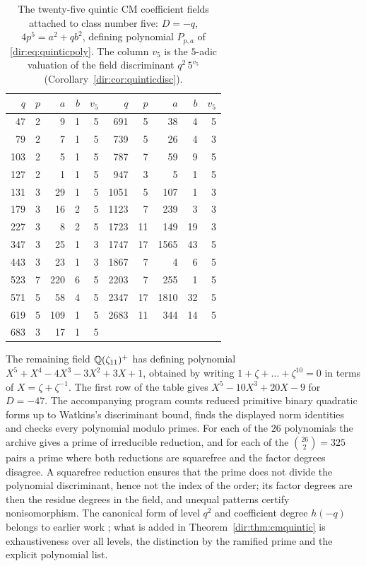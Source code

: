 \begin{table}[ht]
\centering\small
\begin{tabular}{rrrrr@{\qquad}rrrrr}
\toprule
$q$ & $p$ & $a$ & $b$ & $v_5$ & $q$ & $p$ & $a$ & $b$ & $v_5$\\
\midrule
47 & 2 & 9 & 1 & 5 & 691 & 5 & 38 & 4 & 5\\
79 & 2 & 7 & 1 & 5 & 739 & 5 & 26 & 4 & 3\\
103 & 2 & 5 & 1 & 5 & 787 & 7 & 59 & 9 & 5\\
127 & 2 & 1 & 1 & 5 & 947 & 3 & 5 & 1 & 5\\
131 & 3 & 29 & 1 & 5 & 1051 & 5 & 107 & 1 & 3\\
179 & 3 & 16 & 2 & 5 & 1123 & 7 & 239 & 3 & 3\\
227 & 3 & 8 & 2 & 5 & 1723 & 11 & 149 & 19 & 3\\
347 & 3 & 25 & 1 & 3 & 1747 & 17 & 1565 & 43 & 5\\
443 & 3 & 23 & 1 & 3 & 1867 & 7 & 4 & 6 & 5\\
523 & 7 & 220 & 6 & 5 & 2203 & 7 & 255 & 1 & 5\\
571 & 5 & 58 & 4 & 5 & 2347 & 17 & 1810 & 32 & 5\\
619 & 5 & 109 & 1 & 5 & 2683 & 11 & 344 & 14 & 5\\
683 & 3 & 17 & 1 & 5 &  & & & & \\
\bottomrule
\end{tabular}
\caption{The twenty-five quintic CM coefficient fields attached to class number five:
$D=-q$, $4p^5=a^2+qb^2$, defining polynomial $P_{p,a}$ of \eqref{dir:eq:quinticpoly}.
The column $v_5$ is the $5$-adic valuation of the field discriminant $q^2\,5^{v_5}$
(Corollary~\ref{dir:cor:quinticdisc}).}\label{dir:tab:quintic}
\end{table}

The remaining field $\mathbb{Q}(\zeta_{11})^+$ has defining polynomial
$X^5+X^4-4X^3-3X^2+3X+1$, obtained by writing $1+\zeta+\dots+\zeta^{10}=0$ in terms of
$X=\zeta+\zeta^{-1}$. The first row of the table gives $X^5-10X^3+20X-9$ for $D=-47$.
The accompanying program counts reduced primitive binary quadratic forms up to
Watkins's discriminant bound, finds the displayed norm identities and checks every
polynomial modulo primes. For each of the $26$ polynomials the archive gives a prime of
irreducible reduction, and for each of the $\binom{26}{2}=325$ pairs a prime where both
reductions are squarefree and the factor degrees disagree. A
squarefree reduction ensures that the prime does not divide the polynomial
discriminant, hence not the index of the order; its factor degrees are then the
residue degrees in the field, and unequal patterns certify nonisomorphism. The
canonical form of level $q^2$ and coefficient degree $h(-q)$ belongs to earlier work
\cite{GonzalezLario2008Qcurves,GrossHecke}; what is added in
Theorem~\ref{dir:thm:cmquintic} is exhaustiveness over all levels, the distinction by the
ramified prime and the explicit polynomial list.

